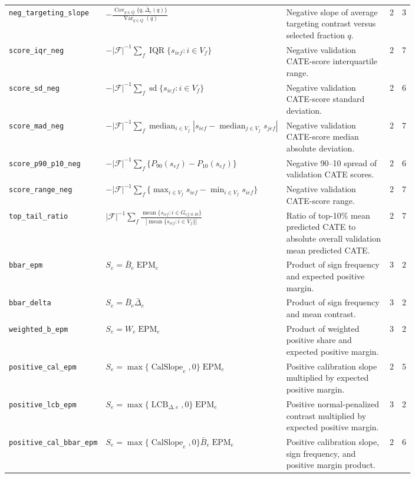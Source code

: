 \begin{landscape}
\begin{longtable}{@{}p{0.175\linewidth}p{0.30\linewidth}p{0.32\linewidth}cc@{}}
\texttt{neg\_targeting\_slope} & \(-\frac{\operatorname{Cov}_{q\in Q}\{q,\bar\Delta_e(q)\}}{\operatorname{Var}_{q\in Q}(q)}\) & Negative slope of average targeting contrast versus selected fraction \(q\). & 2 & 3 \\
\texttt{score\_iqr\_neg} & \(-|\mathcal F|^{-1}\sum_f\operatorname{IQR}\{s_{ief}:i\in V_f\}\) & Negative validation CATE-score interquartile range. & 2 & 7 \\
\texttt{score\_sd\_neg} & \(-|\mathcal F|^{-1}\sum_f\operatorname{sd}\{s_{ief}:i\in V_f\}\) & Negative validation CATE-score standard deviation. & 2 & 6 \\
\texttt{score\_mad\_neg} & \(-|\mathcal F|^{-1}\sum_f\operatorname{median}_{i\in V_f}|s_{ief}-\operatorname{median}_{j\in V_f}s_{jef}|\) & Negative validation CATE-score median absolute deviation. & 2 & 7 \\
\texttt{score\_p90\_p10\_neg} & \(-|\mathcal F|^{-1}\sum_f\{P_{90}(s_{ef})-P_{10}(s_{ef})\}\) & Negative 90--10 spread of validation CATE scores. & 2 & 6 \\
\texttt{score\_range\_neg} & \(-|\mathcal F|^{-1}\sum_f\{\max_{i\in V_f}s_{ief}-\min_{i\in V_f}s_{ief}\}\) & Negative validation CATE-score range. & 2 & 7 \\
\texttt{top\_tail\_ratio} & \(|\mathcal F|^{-1}\sum_f\frac{\operatorname{mean}\{s_{ief}:i\in G_{ef,0.10}\}}{|\operatorname{mean}\{s_{ief}:i\in V_f\}|}\) & Ratio of top-10\% mean predicted CATE to absolute overall validation mean predicted CATE. & 2 & 7 \\
\texttt{bbar\_epm} & \(S_e=\bar B_e\operatorname{EPM}_e\) & Product of sign frequency and expected positive margin. & 3 & 2 \\
\texttt{bbar\_delta} & \(S_e=\bar B_e\bar\Delta_e\) & Product of sign frequency and mean contrast. & 3 & 2 \\
\texttt{weighted\_b\_epm} & \(S_e=W_e\operatorname{EPM}_e\) & Product of weighted positive share and expected positive margin. & 3 & 2 \\
\texttt{positive\_cal\_epm} & \(S_e=\max\{\operatorname{CalSlope}_e,0\}\operatorname{EPM}_e\) & Positive calibration slope multiplied by expected positive margin. & 2 & 5 \\
\texttt{positive\_lcb\_epm} & \(S_e=\max\{\operatorname{LCB}_{\Delta,e},0\}\operatorname{EPM}_e\) & Positive normal-penalized contrast multiplied by expected positive margin. & 3 & 2 \\
\texttt{positive\_cal\_bbar\_epm} & \(S_e=\max\{\operatorname{CalSlope}_e,0\}\bar B_e\operatorname{EPM}_e\) & Positive calibration slope, sign frequency, and positive margin product. & 2 & 6 \\

\end{longtable}
\end{landscape}
